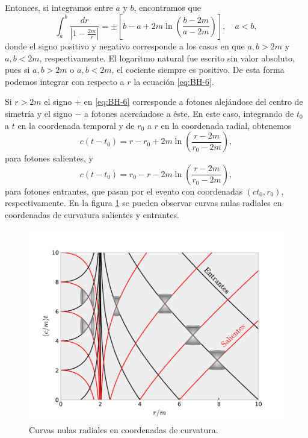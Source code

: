 \documentclass[letterpaper,11pt]{article}
\begin{document}
Entonces, si integramos entre $a$ y $b$, encontramos que
\begin{equation}
\int_a^b \frac{dr}{\left| 1 - \frac{2m}{r} \right|}  = \pm \left[ b - a + 2m\ln\left(\frac{b-2m}{a-2m}\right) \right], \quad a < b,
\end{equation}
donde el signo positivo y negativo corresponde a los casos en que $a,b > 2m$ y $a,b < 2m$, respectivamente. El logaritmo natural fue escrito sin valor absoluto, pues si $a,b > 2m$ o  $a,b < 2m$, el cociente siempre es positivo. De esta forma podemos integrar con respecto a $r$ la ecuación \eqref{eq:BH-6}.

Si $r > 2m$ el signo $+$ en \eqref{eq:BH-6} corresponde a fotones alejándose del centro de simetría y el signo $-$ a fotones acercándose a éste. En este caso, integrando de $t_0$ a $t$ en la coordenada temporal y de $r_0$ a $r$ en la coordenada radial, obtenemos
\begin{equation}
c(t - t_0) = r - r_0 + 2m \ln\left(\frac{r - 2m}{r_0 - 2m}\right),  \label{eq:BH-out}
\end{equation}
para fotones salientes, y
\begin{equation}
c(t - t_0) = r_0 - r - 2m \ln\left(\frac{r - 2m}{r_0 - 2m}\right),  \label{eq:BH-in}
\end{equation}
para fotones entrantes, que pasan por el evento con coordenadas $(ct_0,r_0)$, respectivamente. En la figura \ref{fig:Null-Curves-Sch} se pueden observar curvas nulas radiales en coordenadas de curvatura salientes y entrantes.

\begin{figure}
\centering
\includegraphics[scale=0.7]{Fig-Curvas-Nulas-Schwarzschild}
\caption{Curvas nulas radiales en coordenadas de curvatura.}
\label{fig:Null-Curves-Sch}
\end{figure}
\end{document}
